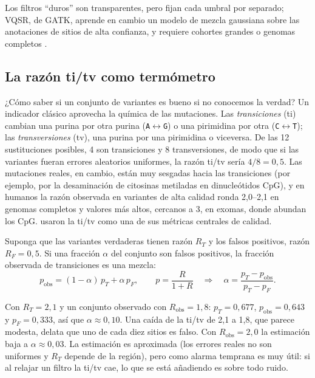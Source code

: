 Los filtros ``duros'' son transparentes, pero fijan cada umbral por separado; VQSR, de GATK, aprende en cambio un modelo de mezcla gaussiana sobre las anotaciones de sitios de alta confianza, y requiere cohortes grandes o genomas completos \parencite{c09-depristo2011}.

\subsection{La razón ti/tv como termómetro}

¿Cómo saber si un conjunto de variantes es bueno si no conocemos la verdad? Un indicador clásico aprovecha la química de las mutaciones. Las \emph{transiciones} (ti) cambian una purina por otra purina (\texttt{A}$\leftrightarrow$\texttt{G}) o una pirimidina por otra (\texttt{C}$\leftrightarrow$\texttt{T}); las \emph{transversiones} (tv), una purina por una pirimidina o viceversa. De las 12 sustituciones posibles, 4 son transiciones y 8 transversiones, de modo que si las variantes fueran errores aleatorios uniformes, la razón ti/tv sería $4/8=0{,}5$. Las mutaciones reales, en cambio, están muy sesgadas hacia las transiciones (por ejemplo, por la desaminación de citosinas metiladas en dinucleótidos CpG), y en humanos la razón observada en variantes de alta calidad ronda 2,0--2,1 en genomas completos y valores más altos, cercanos a 3, en exomas, donde abundan los CpG. \textcite{c09-depristo2011} usaron la ti/tv como una de sus métricas centrales de calidad.

Suponga que las variantes verdaderas tienen razón $R_T$ y los falsos positivos, razón $R_F=0{,}5$. Si una fracción $\alpha$ del conjunto son falsos positivos, la fracción observada de transiciones es una mezcla:
\begin{equation}\label{eq:09-titv}
p_{\text{obs}} = (1-\alpha)\,p_T + \alpha\,p_F,\qquad p = \frac{R}{1+R}
\quad\Longrightarrow\quad
\alpha = \frac{p_T - p_{\text{obs}}}{p_T - p_F}.
\end{equation}

\begin{simbolos}
\end{simbolos}

Con $R_T=2{,}1$ y un conjunto observado con $R_\text{obs}=1{,}8$: $p_T=0{,}677$, $p_\text{obs}=0{,}643$ y $p_F=0{,}333$, así que $\alpha\approx0{,}10$. Una caída de la ti/tv de 2,1 a 1,8, que parece modesta, delata que uno de cada diez sitios es falso. Con $R_\text{obs}=2{,}0$ la estimación baja a $\alpha\approx0{,}03$. La estimación es aproximada (los errores reales no son uniformes y $R_T$ depende de la región), pero como alarma temprana es muy útil: si al relajar un filtro la ti/tv cae, lo que se está añadiendo es sobre todo ruido.

